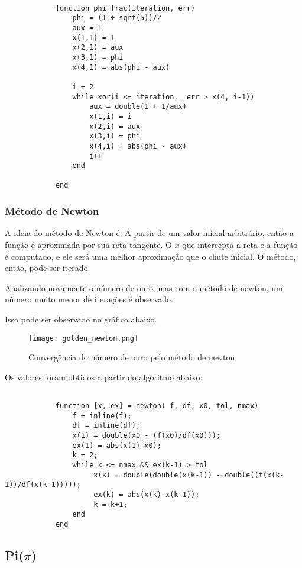			\begin{lstlisting}

			function phi_frac(iteration, err)
				phi = (1 + sqrt(5))/2
				aux = 1
				x(1,1) = 1
				x(2,1) = aux
				x(3,1) = phi
				x(4,1) = abs(phi - aux)

				i = 2
				while xor(i <= iteration,  err > x(4, i-1))
					aux = double(1 + 1/aux)
					x(1,i) = i
					x(2,i) = aux
					x(3,i) = phi
					x(4,i) = abs(phi - aux)
					i++
				end

			end

			\end{lstlisting}

		\subsubsection{Método de Newton}

			A ideia do método de Newton é: A partir de um valor inicial
			arbitrário, então a função é aproximada por sua reta tangente. O $x$
			que intercepta a reta e a função é computado, e ele será uma melhor
			aproximação que o chute inicial. O método, então, pode ser iterado.

			Analizando novamente o número de ouro, mas com o método de newton,
			um número muito menor de iterações é observado.

			

			Isso pode ser observado no gráfico abaixo.

			\begin{figure}[H]
				\centering
				\texttt{[image: golden\_newton.png]}
				\caption{Convergência do número de ouro pelo método de newton}
				\label{golden_newton}
			\end{figure}

			Os valores foram obtidos a partir do algoritmo abaixo:

			\begin{lstlisting}

			function [x, ex] = newton( f, df, x0, tol, nmax)
				f = inline(f);
				df = inline(df);
				x(1) = double(x0 - (f(x0)/df(x0)));
				ex(1) = abs(x(1)-x0);
				k = 2;
				while k <= nmax && ex(k-1) > tol
					 x(k) = double(double(x(k-1)) - double((f(x(k-1))/df(x(k-1)))));
					 ex(k) = abs(x(k)-x(k-1));
					 k = k+1;
				end
			end

			\end{lstlisting}

	\subsection{Pi($\pi$)}


